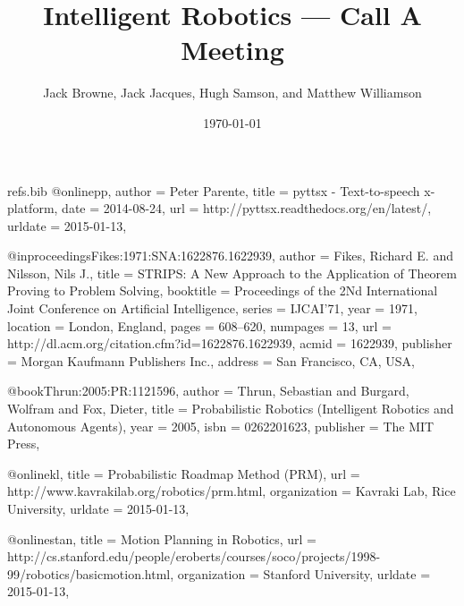 \begin{filecontents}{refs.bib}
@online{pp,
author = {Peter Parente},
title = {pyttsx - Text-to-speech x-platform},
date = {2014-08-24},
url = {http://pyttsx.readthedocs.org/en/latest/},
urldate = {2015-01-13},
}

@inproceedings{Fikes:1971:SNA:1622876.1622939,
 author = {Fikes, Richard E. and Nilsson, Nils J.},
 title = {STRIPS: A New Approach to the Application of Theorem Proving to Problem Solving},
 booktitle = {Proceedings of the 2Nd International Joint Conference on Artificial Intelligence},
 series = {IJCAI'71},
 year = {1971},
 location = {London, England},
 pages = {608--620},
 numpages = {13},
 url = {http://dl.acm.org/citation.cfm?id=1622876.1622939},
 acmid = {1622939},
 publisher = {Morgan Kaufmann Publishers Inc.},
 address = {San Francisco, CA, USA},
} 

@book{Thrun:2005:PR:1121596,
 author = {Thrun, Sebastian and Burgard, Wolfram and Fox, Dieter},
 title = {Probabilistic Robotics (Intelligent Robotics and Autonomous Agents)},
 year = {2005},
 isbn = {0262201623},
 publisher = {The MIT Press},
} 

@online{kl,
title = {Probabilistic Roadmap Method (PRM)},
url = {http://www.kavrakilab.org/robotics/prm.html},
organization = {Kavraki Lab, Rice University},
urldate = {2015-01-13},
}

@online{stan,
title = {Motion Planning in Robotics},
url = {http://cs.stanford.edu/people/eroberts/courses/soco/projects/1998-99/robotics/basicmotion.html},
organization = {Stanford University},
urldate = {2015-01-13},
}


\end{filecontents}

\documentclass[10pt]{article}
\usepackage{times}
\usepackage[backend=biber,style=authoryear]{biblatex}
\usepackage[british]{babel}
\usepackage{courier}
\usepackage{listings}
\usepackage{array}
\usepackage{graphicx}
\usepackage{gensymb}
\usepackage[margin=1.1in]{geometry}
\usepackage{fixltx2e}





\title{Intelligent Robotics --- Call A Meeting}

\author{Jack Browne, Jack Jacques, Hugh Samson, and Matthew Williamson}
\date{\today}
\maketitle

\section{Introduction}

